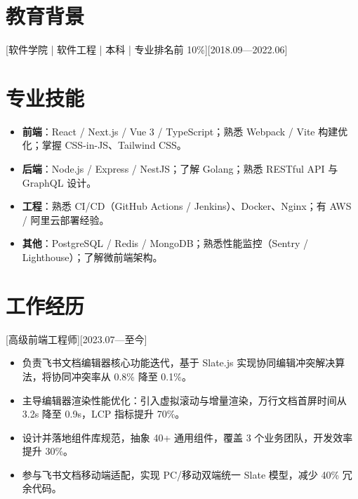 \documentclass{resume-photo}
\begin{document}

\ResumeTitle


\section{教育背景}
[\textnormal{软件学院 | 软件工程 | 本科 | 专业排名前 10\%}][2018.09—2022.06]

\section{专业技能}
\begin{itemize}
  \item \textbf{前端}：React / Next.js / Vue 3 / TypeScript；熟悉 Webpack / Vite 构建优化；掌握 CSS-in-JS、Tailwind CSS。
  \item \textbf{后端}：Node.js / Express / NestJS；了解 Golang；熟悉 RESTful API 与 GraphQL 设计。
  \item \textbf{工程}：熟悉 CI/CD（GitHub Actions / Jenkins）、Docker、Nginx；有 AWS / 阿里云部署经验。
  \item \textbf{其他}：PostgreSQL / Redis / MongoDB；熟悉性能监控（Sentry / Lighthouse）；了解微前端架构。
\end{itemize}

\section{工作经历}

[\textnormal{高级前端工程师}][2023.07—至今]
\begin{itemize}
  \item 负责飞书文档编辑器核心功能迭代，基于 Slate.js 实现协同编辑冲突解决算法，将协同冲突率从 0.8\% 降至 0.1\%。
  \item 主导编辑器渲染性能优化：引入虚拟滚动与增量渲染，万行文档首屏时间从 3.2s 降至 0.9s，LCP 指标提升 70\%。
  \item 设计并落地组件库规范，抽象 40+ 通用组件，覆盖 3 个业务团队，开发效率提升 30\%。
  \item 参与飞书文档移动端适配，实现 PC/移动双端统一 Slate 模型，减少 40\% 冗余代码。
\end{itemize}
\end{document}
